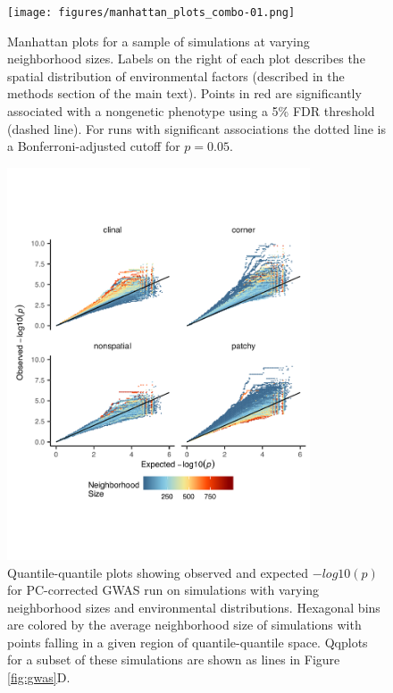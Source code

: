 \documentclass[10pt,twoside,lineno,hidelinks]{preprint}
\begin{document}
\begin{figure}[p]
\centering
\texttt{[image: figures/manhattan\_plots\_combo-01.png]}
\caption{Manhattan plots for a sample of simulations at varying neighborhood sizes. Labels on the right of each plot describes the spatial distribution of environmental factors (described in the methods section of the main text). Points in red are significantly associated with a nongenetic phenotype using a 5\% FDR threshold (dashed line). For runs with significant associations the dotted line is a Bonferroni-adjusted cutoff for $p=0.05$.}
\label{fig:manhattan_plots}
\end{figure}
\FloatBarrier

\begin{figure}[p]
\centering
\includegraphics[width=0.8\textwidth]{figures/qqplots_hexbin.pdf}
\caption{Quantile-quantile plots showing observed and expected $-log10(p)$ for PC-corrected GWAS run on simulations with varying neighborhood sizes and environmental distributions. Hexagonal bins are colored by the average neighborhood size of simulations with points falling in a given region of quantile-quantile space. Qqplots for a subset of these simulations are shown as lines in Figure \ref{fig:gwas}D.} 
\label{fig:qqplot_hexbins}
\end{figure}
\FloatBarrier
\end{document}
